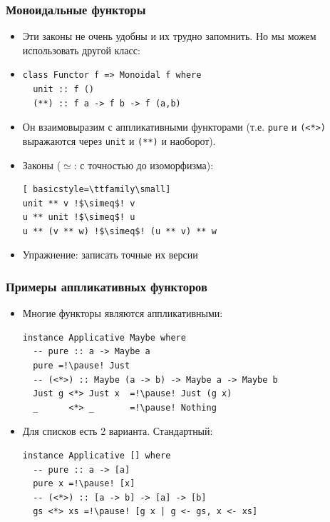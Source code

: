 \documentclass[11pt]{beamer}
\begin{document}
\begin{frame}[fragile]
\frametitle{Моноидальные функторы}
\begin{itemize}
    \item Эти законы не очень удобны и их трудно запомнить. Но мы можем использовать другой класс:
    \item
\begin{lstlisting}[basicstyle=\ttfamily\small]
class Functor f => Monoidal f where
  unit :: f ()
  (**) :: f a -> f b -> f (a,b)
\end{lstlisting}
\item Он взаимовыразим с аппликативными функторами (т.е. \lstinline|pure| и \lstinline|(<*>)| выражаются через \lstinline|unit| и \lstinline|(**)| и наоборот).
\item Законы ($\simeq$: с точностью до изоморфизма):
\begin{lstlisting}[ basicstyle=\ttfamily\small]
unit ** v !$\simeq$! v
u ** unit !$\simeq$! u
u ** (v ** w) !$\simeq$! (u ** v) ** w
\end{lstlisting}
\item Упражнение: записать точные их версии
\end{itemize}
\end{frame}

\begin{frame}[fragile]
\frametitle{Примеры аппликативных функторов}
\begin{itemize}
    \item Многие функторы являются аппликативными:
\begin{lstlisting}[basicstyle=\ttfamily\small]
instance Applicative Maybe where 
  -- pure :: a -> Maybe a
  pure =!\pause! Just
  -- (<*>) :: Maybe (a -> b) -> Maybe a -> Maybe b
  Just g <*> Just x  =!\pause! Just (g x)
  _      <*> _       =!\pause! Nothing
\end{lstlisting}
\pause
\item Для списков есть 2 варианта. Стандартный:
\begin{lstlisting}[basicstyle=\ttfamily\small]
instance Applicative [] where 
  -- pure :: a -> [a]
  pure x =!\pause! [x]
  -- (<*>) :: [a -> b] -> [a] -> [b]
  gs <*> xs =!\pause! [g x | g <- gs, x <- xs]
\end{lstlisting}
\end{itemize}
\end{frame}
\end{document}
